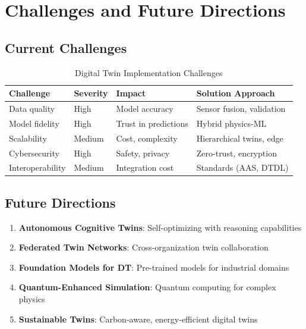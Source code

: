 \documentclass[12pt,a4paper]{article}
\begin{document}
\section{Challenges and Future Directions}

\subsection{Current Challenges}

\begin{table}[H]
\centering
\caption{Digital Twin Implementation Challenges}
\begin{tabular}{llll}
\toprule
\textbf{Challenge} & \textbf{Severity} & \textbf{Impact} & \textbf{Solution Approach} \\
\midrule
Data quality & High & Model accuracy & Sensor fusion, validation \\
Model fidelity & High & Trust in predictions & Hybrid physics-ML \\
Scalability & Medium & Cost, complexity & Hierarchical twins, edge \\
Cybersecurity & High & Safety, privacy & Zero-trust, encryption \\
Interoperability & Medium & Integration cost & Standards (AAS, DTDL) \\
\bottomrule
\end{tabular}
\end{table}

\subsection{Future Directions}

\begin{enumerate}
    \item \textbf{Autonomous Cognitive Twins}: Self-optimizing with reasoning capabilities
    \item \textbf{Federated Twin Networks}: Cross-organization twin collaboration
    \item \textbf{Foundation Models for DT}: Pre-trained models for industrial domains
    \item \textbf{Quantum-Enhanced Simulation}: Quantum computing for complex physics
    \item \textbf{Sustainable Twins}: Carbon-aware, energy-efficient digital twins
\end{enumerate}
\end{document}
